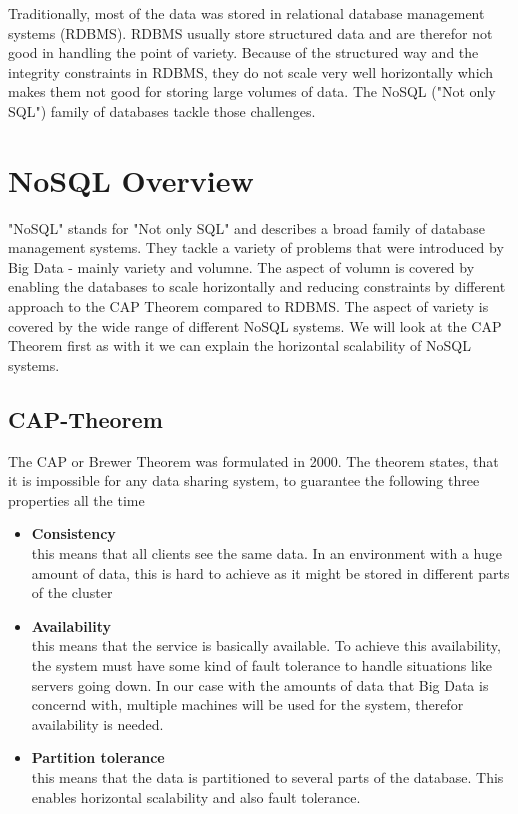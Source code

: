 \documentclass{acm_proc_article-sp}
\begin{document}
Traditionally, most of the data was stored in relational database management systems (RDBMS). RDBMS usually store structured data and are therefor not good in handling the point of variety. Because of the structured way and the integrity constraints in RDBMS, they do not scale very well horizontally which makes them not good for storing large volumes of data. The NoSQL ("Not only SQL") family of databases tackle those challenges.

\section{NoSQL Overview}

"NoSQL" stands for "Not only SQL" and describes a broad family of database management systems. They tackle a variety of problems that were introduced by Big Data - mainly variety and volumne. The aspect of volumn is covered by enabling the databases to scale horizontally and reducing constraints by different approach to the CAP Theorem compared to RDBMS. The aspect of variety is covered by the wide range of different NoSQL systems. We will look at the CAP Theorem first as with it we can explain the horizontal scalability of NoSQL systems.

\subsection{CAP-Theorem}

The CAP or Brewer Theorem\cite{Gilbert:2002:BCF:564585.564601} was formulated in 2000. The  theorem  states, that it is impossible for any data sharing system, to guarantee the following three properties all the time

\begin{itemize}
	\item \textbf{Consistency} \\ this means that all clients see the same data. In an environment with a huge amount of data, this is hard to achieve as it might be stored in different parts of the cluster
	\item \textbf{Availability} \\ this means that the service is basically available. To achieve this availability, the system must have some kind of fault tolerance to handle situations like servers going down. In our case with the amounts of data that Big Data is concernd with, multiple machines will be used for the system, therefor availability is needed.
	\item \textbf{Partition tolerance} \\ this means that the data is partitioned to several parts of the database. This enables horizontal scalability and also fault tolerance.
\end{itemize}
\end{document}
